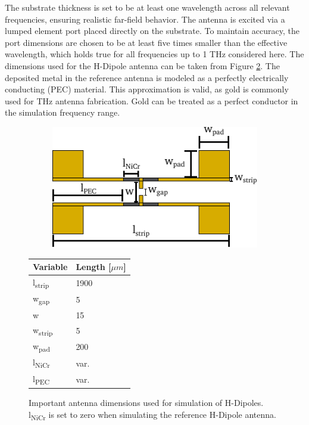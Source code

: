 The substrate thickness is set to be at least one wavelength across all relevant frequencies, ensuring realistic far-field behavior. The antenna is excited via a lumped element port placed directly on the substrate. To maintain accuracy, the port dimensions are chosen to be at least five times smaller than the effective wavelength, which holds true for all frequencies up to \num{1} \si{\tera\hertz} considered here. The dimensions used for the H-Dipole antenna can be taken from Figure \ref{fig:sim_dimensions}. The deposited metal in the reference antenna is modeled as a perfectly electrically conducting (PEC) material. This approximation is valid, as gold is commonly used for THz antenna fabrication. Gold can be treated as a perfect conductor in the simulation frequency range.

\begin{figure}[htbp]
    \centering
        \begin{subfigure}[c]{0.45\textwidth}
        \centering
        \includegraphics[width=\linewidth]{figures/sim_NICR_abmessungen.pdf}
        \label{fig:NICR}
    \end{subfigure}
    \hspace{0.1em}
    \begin{subtable}[c]{0.45\textwidth}
        \centering
        \begin{tabular}{ll}
        \toprule
        Variable & Length [$\mu m$]\\
        \midrule
        l\textsubscript{strip} & 1900 \\
        w\textsubscript{gap} & 5 \\
        w & 15 \\
        w\textsubscript{strip} & 5 \\
        w\textsubscript{pad} & 200 \\
        l\textsubscript{NiCr} & var. \\
        l\textsubscript{PEC} & var. \\
        \bottomrule
        \end{tabular}
        \label{tab:table}
    \end{subtable}
    \caption{Important antenna dimensions used for simulation of H-Dipoles. l\textsubscript{NiCr} is set to zero when simulating the reference H-Dipole antenna.}
    \label{fig:sim_dimensions}
\end{figure}

